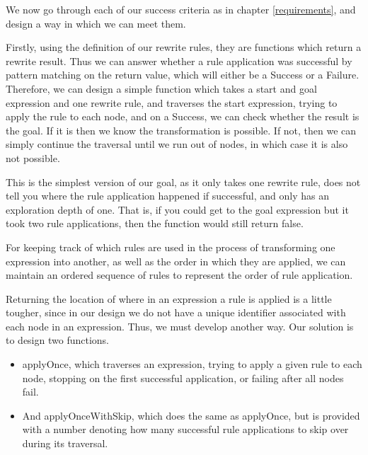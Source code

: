 \documentclass{l4proj}
\begin{document}
We now go through each of our success criteria as in chapter \ref{requirements}, and design a way in which we can meet them.


Firstly, using the definition of our rewrite rules, they are functions which return a rewrite result. Thus we can answer whether a rule application was successful by pattern matching on the return value, which will either be a Success or a Failure. Therefore, we can design a simple function which takes a start and goal expression and one rewrite rule, and traverses the start expression, trying to apply the rule to each node, and on a Success, we can check whether the result is the goal. If it is then we know the transformation is possible. If not, then we can simply continue the traversal until we run out of nodes, in which case it is also not possible.


This is the simplest version of our goal, as it only takes one rewrite rule, does not tell you where the rule application happened if successful, and only has an exploration depth of one. That is, if you could get to the goal expression but it took two rule applications, then the function would still return false.


For keeping track of which rules are used in the process of transforming one expression into another, as well as the order in which they are applied, we can maintain an ordered sequence of rules to represent the order of rule application.


Returning the location of where in an expression a rule is applied is a little tougher, since in our design we do not have a unique identifier associated with each node in an expression. Thus, we must develop another way. Our solution is to design two functions. 
\begin{itemize}
\label{todothis}
    \item applyOnce, which traverses an expression, trying to apply a given rule to each node, stopping on the first successful application, or failing after all nodes fail. 
    \label{TODO} %
    \item And applyOnceWithSkip, which does the same as applyOnce, but is provided with a number denoting how many successful rule applications to skip over during its traversal.
\end{itemize}
\end{document}
